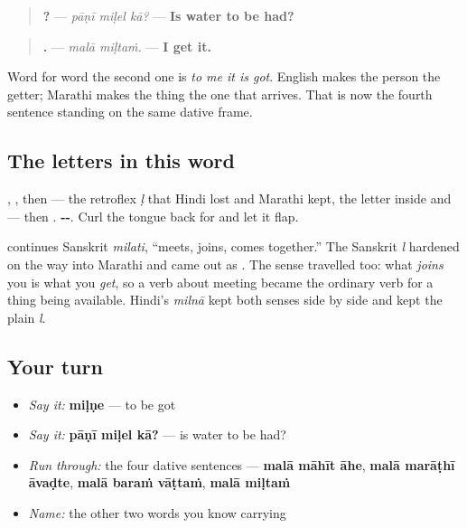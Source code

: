 \begin{quote}
\textbf{  ?} — \emph{pāṇī miḷel kā?} — \textbf{Is water to be had?}
\end{quote}

\begin{quote}
\textbf{ .} — \emph{malā miḷtaṁ.} — \textbf{I get it.}
\end{quote}

Word for word the second one is \emph{to me it is got}. English makes the person the getter; Marathi makes the thing the one that arrives. That is now the fourth sentence standing on the same dative frame.

\subsection*{The letters in this word}
\textbf{}, \textbf{}, then \textbf{} — the retroflex \emph{ḷ} that Hindi lost and Marathi kept, the letter inside \textbf{} and \textbf{} — then \textbf{}. \textbf{--}. Curl the tongue back for \textbf{} and let it flap.

\begin{cousinweb}
\textbf{} continues Sanskrit \textbf{} \emph{milati}, \textquotedblleft{}meets, joins, comes together.\textquotedblright{} The Sanskrit \emph{l} hardened on the way into Marathi and came out as \textbf{}. The sense travelled too: what \emph{joins} you is what you \emph{get}, so a verb about meeting became the ordinary verb for a thing being available. Hindi's \textbf{} \emph{milnā} kept both senses side by side and kept the plain \emph{l}.
\end{cousinweb}

\subsection*{Your turn}
\begin{itemize}
\raggedright
  \item \emph{Say it:} \textbf{miḷṇe} — to be got
  \item \emph{Say it:} \textbf{pāṇī miḷel kā?} — is water to be had?
  \item \emph{Run through:} the four dative sentences — \textbf{malā māhīt āhe}, \textbf{malā marāṭhī āvaḍte}, \textbf{malā baraṁ vāṭtaṁ}, \textbf{malā miḷtaṁ}
  \item \emph{Name:} the other two words you know carrying \textbf{}
\end{itemize}

